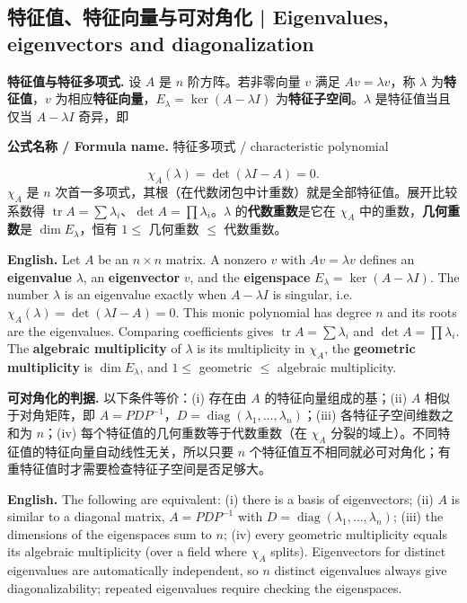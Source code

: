 \documentclass[UTF8,11pt,a4paper]{ctexart}
\newcommand{\EN}[1]{\par\noindent\textbf{English.} #1\par}
\newcommand{\FORMULA}[2]{\par\noindent\textbf{公式名称 / Formula name.} #1 / #2\par}
\begin{document}
\subsection{特征值、特征向量与可对角化 | Eigenvalues, eigenvectors and diagonalization}
\noindent\textbf{特征值与特征多项式.} 设 $A$ 是 $n$ 阶方阵。若非零向量 $v$ 满足 $Av=\lambda v$，称 $\lambda$ 为\textbf{特征值}，$v$ 为相应\textbf{特征向量}，$E_\lambda=\ker(A-\lambda I)$ 为\textbf{特征子空间}。$\lambda$ 是特征值当且仅当 $A-\lambda I$ 奇异，即
\FORMULA{特征多项式}{characteristic polynomial}
\[
\chi_A(\lambda)=\det(\lambda I-A)=0.
\]
$\chi_A$ 是 $n$ 次首一多项式，其根（在代数闭包中计重数）就是全部特征值。展开比较系数得 $\operatorname{tr}A=\sum\lambda_i$、$\det A=\prod\lambda_i$。$\lambda$ 的\textbf{代数重数}是它在 $\chi_A$ 中的重数，\textbf{几何重数}是 $\dim E_\lambda$，恒有 $1\le$ 几何重数 $\le$ 代数重数。
\EN{Let $A$ be an $n\times n$ matrix. A nonzero $v$ with $Av=\lambda v$ defines an \textbf{eigenvalue} $\lambda$, an \textbf{eigenvector} $v$, and the \textbf{eigenspace} $E_\lambda=\ker(A-\lambda I)$. The number $\lambda$ is an eigenvalue exactly when $A-\lambda I$ is singular, i.e. $\chi_A(\lambda)=\det(\lambda I-A)=0$. This monic polynomial has degree $n$ and its roots are the eigenvalues. Comparing coefficients gives $\operatorname{tr}A=\sum\lambda_i$ and $\det A=\prod\lambda_i$. The \textbf{algebraic multiplicity} of $\lambda$ is its multiplicity in $\chi_A$, the \textbf{geometric multiplicity} is $\dim E_\lambda$, and $1\le$ geometric $\le$ algebraic multiplicity.}
\noindent\textbf{可对角化的判据.} 以下条件等价：(i) 存在由 $A$ 的特征向量组成的基；(ii) $A$ 相似于对角矩阵，即 $A=PDP^{-1}$，$D=\operatorname{diag}(\lambda_1,\dots,\lambda_n)$；(iii) 各特征子空间维数之和为 $n$；(iv) 每个特征值的几何重数等于代数重数（在 $\chi_A$ 分裂的域上）。不同特征值的特征向量自动线性无关，所以只要 $n$ 个特征值互不相同就必可对角化；有重特征值时才需要检查特征子空间是否足够大。
\EN{The following are equivalent: (i) there is a basis of eigenvectors; (ii) $A$ is similar to a diagonal matrix, $A=PDP^{-1}$ with $D=\operatorname{diag}(\lambda_1,\dots,\lambda_n)$; (iii) the dimensions of the eigenspaces sum to $n$; (iv) every geometric multiplicity equals its algebraic multiplicity (over a field where $\chi_A$ splits). Eigenvectors for distinct eigenvalues are automatically independent, so $n$ distinct eigenvalues always give diagonalizability; repeated eigenvalues require checking the eigenspaces.}
\end{document}
